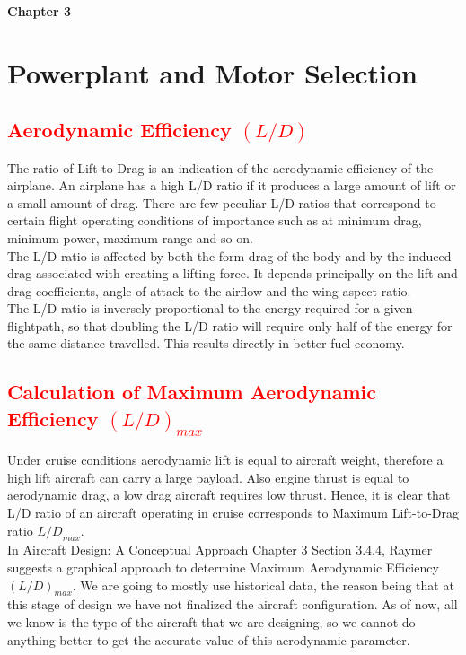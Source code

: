 \documentclass[12 pt]{article}
\begin{document}
\vfill

\afterpage{\clearpage}

\newpage

\textbf{\Huge{Chapter 3}}

\section{Powerplant and Motor Selection}

\subsection{\textcolor{red}{Aerodynamic Efficiency ${(L/D)}$}}
The ratio of Lift-to-Drag is an indication of the aerodynamic efficiency of the airplane. An airplane has a high L/D ratio if it produces a large amount of lift or a small amount of drag. There are few peculiar L/D ratios that correspond to certain flight operating conditions of importance such as at minimum drag, minimum power, maximum range and so on.\\

The L/D ratio is affected by both the form drag of the body and by the induced drag associated with creating a lifting force. It depends principally on the lift and drag coefficients, angle of attack to the airflow and the wing aspect ratio.\\

The L/D ratio is inversely proportional to the energy required for a given flightpath, so that doubling the L/D ratio will require only half of the energy for the same distance travelled. This results directly in better fuel economy.

\subsection{\textcolor{red}{Calculation of Maximum Aerodynamic Efficiency ${(L/D)}_{max}$}}
Under cruise conditions aerodynamic lift is equal to aircraft weight, therefore a high lift aircraft can carry a large payload. Also engine thrust is equal to aerodynamic drag, a low drag aircraft requires low thrust. Hence, it is clear that L/D ratio of an aircraft operating in cruise corresponds to Maximum Lift-to-Drag ratio ${L/D}_{max}$.\\

In Aircraft Design: A Conceptual Approach Chapter 3 Section 3.4.4, Raymer suggests a graphical approach to determine Maximum Aerodynamic Efficiency ${(L/D)}_{max}$. We are going to mostly use historical data, the reason being that at this stage of design we have not finalized the aircraft configuration. As of now, all we know is the type of the aircraft that we are designing, so we cannot do anything better to get the accurate value of this aerodynamic parameter.\\
\end{document}
